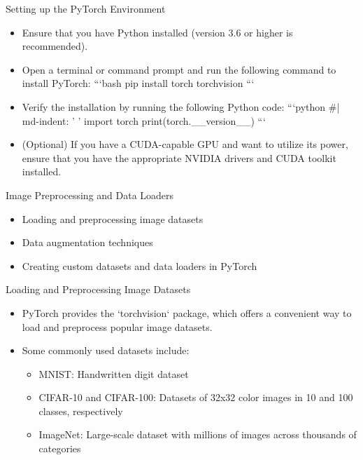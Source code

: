 \documentclass{beamer}
\begin{document}
\begin{frame}{Setting up the PyTorch Environment}
\begin{itemize}
    \item Ensure that you have Python installed (version 3.6 or higher is recommended).
    \item Open a terminal or command prompt and run the following command to install PyTorch:
    ```{bash}
    pip install torch torchvision
    ```
    \item Verify the installation by running the following Python code:
    ```{python}
    #| md-indent: '    '
    import torch
    print(torch.__version__)
    ```
    \item (Optional) If you have a CUDA-capable GPU and want to utilize its power, ensure that you have the appropriate NVIDIA drivers and CUDA toolkit installed. 
\end{itemize}
\end{frame}

\begin{frame}{Image Preprocessing and Data Loaders}
\begin{itemize}
    \item Loading and preprocessing image datasets
    \item Data augmentation techniques
    \item Creating custom datasets and data loaders in PyTorch
\end{itemize}
\end{frame}

\begin{frame}{Loading and Preprocessing Image Datasets}
\begin{itemize}
    \item PyTorch provides the `torchvision` package, which offers a convenient way to load and preprocess popular image datasets. 
    \item Some commonly used datasets include:
        \begin{itemize}
            \item MNIST: Handwritten digit dataset
            \item CIFAR-10 and CIFAR-100: Datasets of 32x32 color images in 10 and 100 classes, respectively
            \item ImageNet: Large-scale dataset with millions of images across thousands of categories
        \end{itemize}
\end{itemize}
\end{frame}
\end{document}
